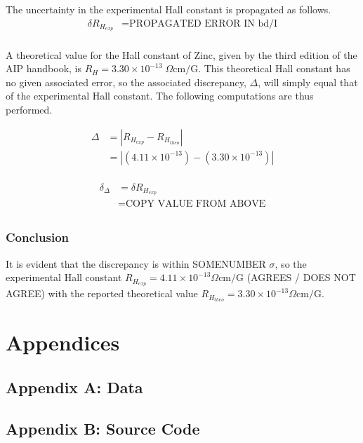\documentclass[a4paper]{article}
\begin{document}
The uncertainty in the experimental Hall constant is propagated as follows.
\begin{align*}
\delta R_{H_{exp}} &= \text{PROPAGATED ERROR IN bd/I} \\
\end{align*}

\qq A theoretical value for the Hall constant of Zinc, given by the
third edition of the AIP handbook, is $R_H = 3.30 \times 10^{-13} \;
\Omega \text{cm/G}$. This theoretical Hall constant has no given
associated error, so the associated discrepancy, $\Delta$, will simply
equal that of the experimental Hall constant. The following
computations are thus performed.

\begin{align*}
\Delta &= | R_{H_{exp}} - R_{H_{theo}} | \\
	   &= | (4.11 \times 10^{-13}) - (3.30 \times 10^{-13}) | \\
\end{align*}

\begin{align*}
\delta_{\Delta} &= \delta R_{H_{exp}} \\
				&= \text{COPY VALUE FROM ABOVE} \\
\end{align*}

\subsubsection{Conclusion}
\qq It is evident that the discrepancy is within SOMENUMBER $\sigma$,
so the experimental Hall constant $R_{H_{exp}} = 4.11 \times 10^{-13}
\Omega \text{cm/G}$ (AGREES / DOES NOT AGREE) with the reported
theoretical value $R_{H_{theo}} = 3.30 \times 10^{-13} \Omega
\text{cm/G}$.

\section{Appendices}

\subsection{Appendix A: Data}

\subsection{Appendix B: Source Code}
\end{document}
